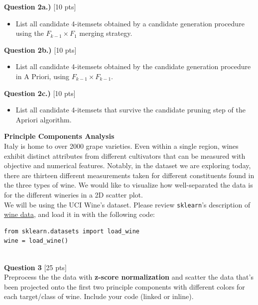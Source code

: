 \documentclass[paper=a4, fontsize=11pt]{scrartcl} %
\begin{document}
{\Large \textbf{Question 2a.)} [10 pts]}
\begin{itemize}
    \item List all candidate 4-itemsets obtained by a candidate generation procedure using the $F_{k - 1} \times F_1$ merging strategy. \\
\end{itemize}
{\Large \textbf{Question 2b.)} [10 pts]}
\begin{itemize}
    \item List all candidate 4-itemsets obtained by the candidate generation procedure in A Priori, using $F_{k-1} \times F_{k-1}$. \\
\end{itemize}
{\Large \textbf{Question 2c.)} [10 pts]} \\
\begin{itemize}
    \item List all candidate 4-itemsets that survive the candidate pruning step of
the Apriori algorithm. \\
\end{itemize}


{\huge \textbf{Principle Components Analysis}} \\

Italy is home to over 2000 grape varieties. Even within a single region, wines exhibit distinct attributes from different cultivators that can be measured with objective and numerical features. Notably, in the dataset we are exploring today, there are thirteen different measurements taken for different constituents found in the three types of wine. We would like to visualize how well-separated the data is for the different wineries in a 2D scatter plot.\\

We will be using the UCI Wine's dataset. Please review \verb"sklearn"'s description of \href{https://scikit-learn.org/stable/modules/generated/sklearn.datasets.load_wine.html}{wine data}, and load it in with the following code:
\begin{verbatim}
from sklearn.datasets import load_wine
wine = load_wine()
\end{verbatim} \\
\vspace{5mm}
{\Large \textbf{Question 3} [25 pts]} \\

Preprocess the the data with \textbf{z-score normalization} and scatter the data that's been projected onto the first two principle components with different colors for each target/class of wine. Include your code (linked or inline).\\
\end{document}
